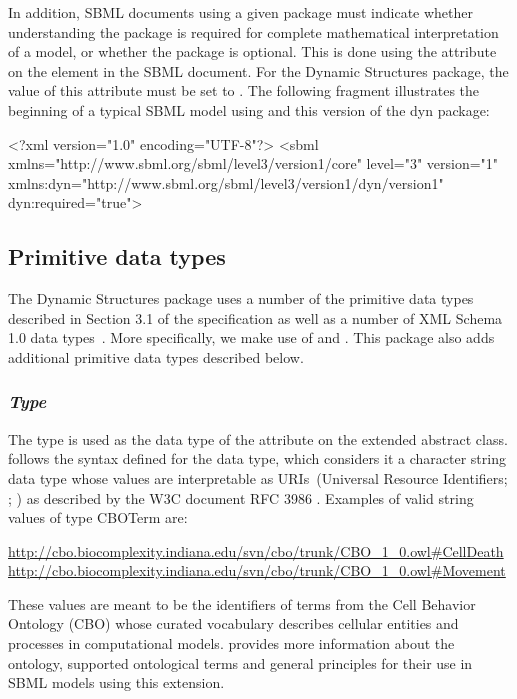 In addition, SBML documents using a given package must indicate whether
understanding the package is required for complete mathematical
interpretation of a model, or whether the package is optional.  This is
done using the attribute  on the  element in
the SBML document.  For the Dynamic Structures package, the value of
this attribute must be set to .
The following fragment illustrates the beginning of a typical SBML model
using \sbmlthreecore and this version of the dyn package:

\begin{example}
<?xml version="1.0" encoding="UTF-8"?>
<sbml xmlns="http://www.sbml.org/sbml/level3/version1/core" level="3" version="1"
     xmlns:dyn="http://www.sbml.org/sbml/level3/version1/dyn/version1" dyn:required="true">
\end{example}

\subsection{Primitive data types}
\label{subsec:primitives}
The Dynamic Structures package uses a number of the primitive data types described in Section 3.1 of the \sbmlthreecore specification as well as a number of XML Schema 1.0 data types~\citep{biron:2000}. More specifically, we make use of  and . This package also adds additional primitive data types described below.

\subsubsection{\emph{Type} }
\label{dat:CBOTerm}

The type  is used as the data type of the attribute  on the extended \SBase abstract class.  follows the syntax defined for the  data type, which considers it a character string data type whose values are interpretable as URIs~(Universal Resource Identifiers; \citep{Means:2001}; \citep{w3c:2000b}) as described by the W3C document RFC 3986 \citep{Berners-Lee:2005}. Examples of valid string values of type CBOTerm are:  
\begin{center}
\url{http://cbo.biocomplexity.indiana.edu/svn/cbo/trunk/CBO_1_0.owl#CellDeath} \url{http://cbo.biocomplexity.indiana.edu/svn/cbo/trunk/CBO_1_0.owl#Movement}
\end{center}
These values are meant to be the identifiers of terms from the Cell Behavior Ontology (CBO) whose curated vocabulary describes cellular entities and processes in computational models.  provides more information about the ontology, supported ontological terms and general principles for their use in SBML models using this extension.

